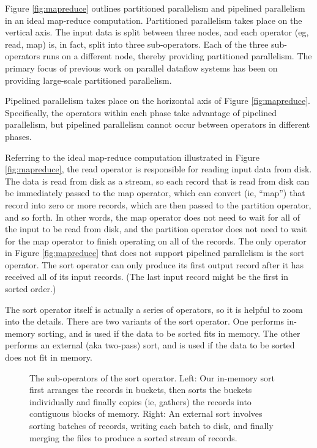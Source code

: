 \documentclass{acm_proc_article-sp}
\begin{document}
Figure \ref{fig:mapreduce} outlines partitioned parallelism and pipelined
parallelism in an ideal map-reduce computation. Partitioned parallelism takes place on the
vertical axis. The input data is split between three nodes, and each operator
(eg, read, map) is, in fact, split into three sub-operators. Each of the three
sub-operators runs on a different node, thereby providing partitioned
parallelism. The primary focus of previous work on parallel dataflow systems
has been on providing large-scale partitioned parallelism.

Pipelined parallelism takes place on the horizontal axis of Figure
\ref{fig:mapreduce}. Specifically, the operators within each phase take
advantage of pipelined parallelism, but pipelined parallelism cannot occur
between operators in different phases.

Referring to the ideal map-reduce computation illustrated in Figure \ref{fig:mapreduce}, the read
operator is responsible for reading input data from disk. The data is read from
disk as a stream, so each record that is read from disk can be immediately
passed to the map operator, which can convert (ie, ``map'') that record into
zero or more records, which are then passed to the partition operator, and so
forth. In other words, the map operator does not need to wait for all of the
input to be read from disk, and the partition operator does not need to wait
for the map operator to finish operating on all of the records. The only
operator in Figure \ref{fig:mapreduce} that does not support pipelined
parallelism is the sort operator. The sort operator can only produce its first
output record after it has received all of its input records. (The last input
record might be the first in sorted order.)

The sort operator itself is actually a series of operators, so it is helpful to zoom into the details. There are two variants of the sort operator. One performs in-memory sorting, and is used if the data to be sorted fits in memory. The other performs an external (aka two-pass) sort, and is used if the data to be sorted does not fit in memory.

\begin{figure}
\caption{The sub-operators of the sort operator. Left: Our in-memory sort first arranges the records in buckets, then sorts the buckets individually and finally copies (ie, gathers) the records into contiguous blocks of memory. Right: An external sort involves sorting batches of records, writing each batch to disk, and finally merging the files to produce a sorted stream of records.}
\label{fig:sort}
\end{figure}
\end{document}
